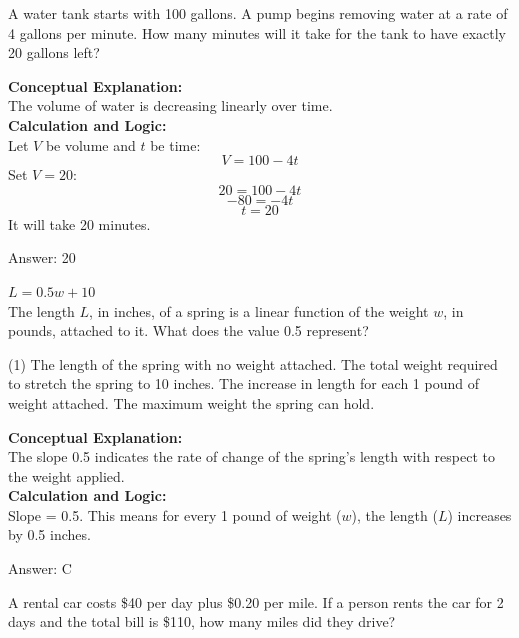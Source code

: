 \documentclass[11pt,paper=a4,answers]{exam}
\begin{document}
\begin{questions}
\question
A water tank starts with 100 gallons. A pump begins removing water at a rate of 4 gallons per minute. How many minutes will it take for the tank to have exactly 20 gallons left?

\begin{solution}
\textbf{Conceptual Explanation:} \\
The volume of water is decreasing linearly over time.
\\[10pt]
\textbf{Calculation and Logic:} \\
Let $V$ be volume and $t$ be time:
\[V = 100 - 4t\]
Set $V = 20$:
\[20 = 100 - 4t\]
\[-80 = -4t\]
\[t = 20\]
It will take 20 minutes.

\vspace{15pt}
Answer: \colorbox{yellow!100}{20}
\end{solution}

\question
$L = 0.5w + 10$ \\
The length $L$, in inches, of a spring is a linear function of the weight $w$, in pounds, attached to it. What does the value 0.5 represent?
\begin{tasks}(1)
    \task The length of the spring with no weight attached.
    \task The total weight required to stretch the spring to 10 inches.
    \task The increase in length for each 1 pound of weight attached.
    \task The maximum weight the spring can hold.
\end{tasks}

\begin{solution}
\textbf{Conceptual Explanation:} \\
The slope 0.5 indicates the rate of change of the spring's length with respect to the weight applied.
\\[10pt]
\textbf{Calculation and Logic:} \\
Slope = 0.5. 
This means for every 1 pound of weight ($w$), the length ($L$) increases by 0.5 inches.

\vspace{15pt}
Answer: \colorbox{yellow!100}{C}
\end{solution}

\question
A rental car costs \$40 per day plus \$0.20 per mile. If a person rents the car for 2 days and the total bill is \$110, how many miles did they drive?


\end{questions}
\end{document}
